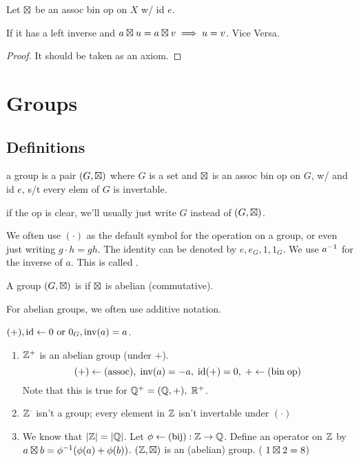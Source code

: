 \documentclass[12pt]{article}
\begin{document}


\bbox
\begin{lem}\label{lem:cancel_prop}
  Let \(\boxtimes\) be an assoc bin op on \(X\) w/ id \(e\). 

  If it has a left inverse and \(a\boxtimes u=a\boxtimes v\implies u=v\).
  Vice Versa.
\end{lem}
\ebox

\bboxproof
\begin{proof}
  It should be taken as an axiom.
\end{proof}
\ebox

\section{Groups}
\subsection{Definitions}
\bbox
\begin{defn}[Group]\label{defn:group}
  a group is a pair \((G,\boxtimes)\) where \(G\) is a set and \(\boxtimes\)
  is an assoc bin op on \(G\), w/ and id \(e\), s/t every elem of \(G\) is 
  invertable.
\end{defn}
\ebox

\bbox
\begin{nota}\label{nota:mul_nota}
  if the op is clear, we'll usually just write \(G\) instead of \((G,\boxtimes)\).

  We often use \((\cdot)\) as the default symbol for the operation on a group,
  or even just writing \(g\cdot h=gh\). The identity can be denoted by
  \(e,e_G,1,1_G\). We use \(a^{-1}\) for the inverse of \(a\). This is called
  .
\end{nota}
\ebox

\bbox
\begin{defn}\label{defn:abel_group}
  A group \((G,\boxtimes)\) is  if \(\boxtimes\) is abelian (commutative).
\end{defn}
\ebox

For abelian groups, we often use additive notation.

\((+),\mathrm{id}\leftarrow 0 \text{ or } 0_G, \mathrm{inv}(a)=a\).

\bboxex
\begin{enumerate}
  \item \(\mathbb Z^+\) is an abelian group (under \(+\)).
    \[(+)\leftarrow(\mathrm{assoc}),\;\mathrm{inv}(a)=-a,\;\mathrm{id}(+)=0,\;+\leftarrow(\mathrm{bin\;op})\]
    Note that this is true for \(\mathbb Q^+=(\mathbb Q,+),\;\mathbb R^+\).
  \item \(\mathbb Z^\cdot\) isn't a group; every element in \(\mathbb Z\) isn't invertable under
    \((\cdot)\)
  \item We know that \(|\mathbb Z|=|\mathbb Q|\). Let \(\phi\leftarrow(\mathrm{bij}):\mathbb Z\to\mathbb Q\).
    Define an operator on \(\mathbb Z\) by \(a\boxtimes b=\phi^{-1}(\phi(a)+\phi(b))\).
    \((\mathbb Z,\boxtimes)\) is an (abelian) group. ( \(1\boxtimes 2=8\))
\end{enumerate}
\ebox
\end{document}
